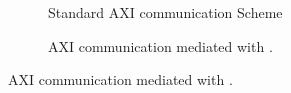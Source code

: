\begin{figure}
    \centering
    \begin{subfigure}{0.49\textwidth}
      \centering
      
      \caption{Standard AXI communication Scheme}
      \label{fig:axi_transaction_scheme_figure}
  \end{subfigure}
  \hfill
  \begin{subfigure}{0.49\textwidth}
      \centering
      
      \caption{AXI communication mediated with \schim.}
      \label{fig:SchIM_transaction_scheme_figure}
  \end{subfigure}
\end{figure}
